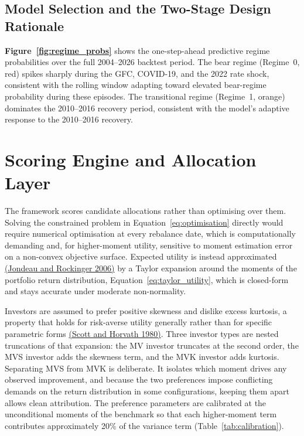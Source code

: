 \documentclass[11pt, a4paper]{article}
\newcommand{\cit}[2]{\hyperlink{ref:#1}{\textcolor{elsblue}{#2}}}
\begin{document}
\subsection{Model Selection and the Two-Stage Design Rationale}

\textbf{Figure~\ref{fig:regime_probs}} shows the one-step-ahead predictive regime probabilities over the full 2004--2026 backtest period. The bear regime (Regime~0, red) spikes sharply during the GFC, COVID-19, and the 2022 rate shock, consistent with the rolling window adapting toward elevated bear-regime probability during these episodes. The transitional regime (Regime~1, orange) dominates the 2010--2016 recovery period, consistent with the model's adaptive response to the 2010--2016 recovery.

\section{Scoring Engine and Allocation Layer}
\label{sec:preferences}
\label{sec:allocation}

The framework scores candidate allocations rather than optimising over them. Solving the
constrained problem in Equation~\eqref{eq:optimisation} directly would require numerical
optimisation at every rebalance date, which is computationally demanding and, for
higher-moment utility, sensitive to moment estimation error on a non-convex objective surface.
Expected utility is instead approximated \cit{jondeau2006}{(Jondeau and Rockinger 2006)} by a Taylor
expansion around the moments of the portfolio return distribution,
Equation~\eqref{eq:taylor_utility}, which is closed-form and stays accurate under moderate
non-normality. 

Investors are assumed to prefer positive skewness and dislike excess kurtosis, a property
that holds for risk-averse utility generally rather than for specific parametric forms
\cit{scott1980}{(Scott and Horvath 1980)}. Three investor types are nested truncations of that expansion: the MV investor truncates at
the second order, the MVS investor adds the skewness term, and the MVK investor adds
kurtosis. Separating MVS from MVK is deliberate. It isolates which moment drives
any observed improvement, and because the two preferences impose conflicting demands on the
return distribution in some configurations, keeping them apart allows clean attribution. The
preference parameters are calibrated at the unconditional moments of the benchmark so that
each higher-moment term contributes approximately 20\% of the variance term
(Table~\ref{tab:calibration}).
\end{document}
